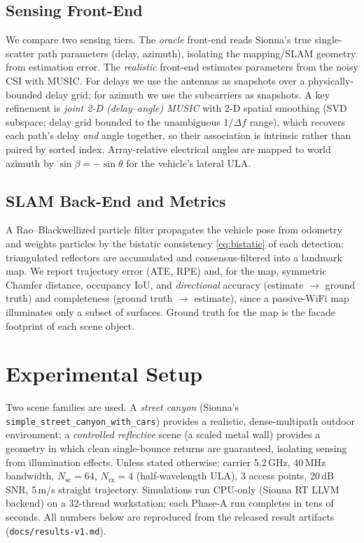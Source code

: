 \documentclass[journal]{IEEEtran}
\newcommand{\SI}[2]{#1\,#2}
\newcommand{\num}[1]{#1}
\begin{document}
\subsection{Sensing Front-End}
We compare two sensing tiers. The \emph{oracle} front-end reads Sionna's true
single-scatter path parameters (delay, azimuth), isolating the mapping/SLAM
geometry from estimation error. The \emph{realistic} front-end estimates parameters
from the noisy CSI with MUSIC. For delays we use the antennas as snapshots over a
physically-bounded delay grid; for azimuth we use the subcarriers as snapshots. A
key refinement is \emph{joint 2-D (delay--angle) MUSIC} with 2-D spatial smoothing
(SVD subspace; delay grid bounded to the unambiguous $1/\Delta f$ range), which
recovers each path's delay \emph{and} angle together, so their association is
intrinsic rather than paired by sorted index. Array-relative electrical angles are
mapped to world azimuth by $\sin\beta=-\sin\theta$ for the vehicle's lateral ULA.

\subsection{SLAM Back-End and Metrics}
A Rao--Blackwellized particle filter propagates the vehicle pose from odometry and
weights particles by the bistatic consistency \eqref{eq:bistatic} of each
detection; triangulated reflectors are accumulated and consensus-filtered into a
landmark map. We report trajectory error (ATE, RPE) and, for the map, symmetric
Chamfer distance, occupancy IoU, and \emph{directional} accuracy (estimate
$\rightarrow$ ground truth) and completeness (ground truth $\rightarrow$ estimate),
since a passive-WiFi map illuminates only a subset of surfaces. Ground truth for the
map is the facade footprint of each scene object.

\section{Experimental Setup}\label{sec:setup}
Two scene families are used. A \emph{street canyon} (Sionna's
\texttt{simple\_street\_canyon\_with\_cars}) provides a realistic, dense-multipath
outdoor environment; a \emph{controlled reflective} scene (a scaled metal wall)
provides a geometry in which clean single-bounce returns are guaranteed, isolating
sensing from illumination effects. Unless stated otherwise: carrier
\SI{5.2}{GHz}, \SI{40}{MHz} bandwidth, $N_\mathrm{sc}=64$, $N_\mathrm{rx}=4$
(half-wavelength ULA), \num{3} access points, \SI{20}{dB} SNR, \SI{5}{m/s} straight
trajectory. Simulations run CPU-only (Sionna RT LLVM backend) on a 32-thread
workstation; each Phase-A run completes in tens of seconds. All numbers below are
reproduced from the released result artifacts (\texttt{docs/results-v1.md}).
\end{document}
